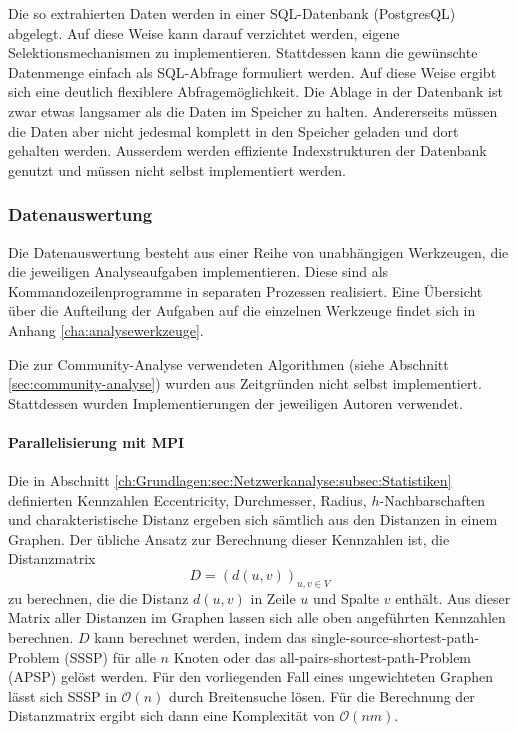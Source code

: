 Die so extrahierten Daten werden in einer SQL-Datenbank (PostgresQL)
abgelegt. Auf diese Weise kann darauf verzichtet werden, eigene
Selektionsmechanismen zu implementieren. Stattdessen kann die
gewünschte Datenmenge einfach als SQL-Abfrage formuliert werden. Auf
diese Weise ergibt sich eine deutlich flexiblere
Abfragemöglichkeit. Die Ablage in der Datenbank ist zwar etwas
langsamer als die Daten im Speicher zu halten. Andererseits müssen die
Daten aber nicht jedesmal komplett in den Speicher geladen und dort
gehalten werden. Ausserdem werden effiziente Indexstrukturen der
Datenbank genutzt und müssen nicht selbst implementiert werden.

\subsubsection{Datenauswertung}
\label{sec:datenauswertung}

Die Datenauswertung besteht aus einer Reihe von unabhängigen
Werkzeugen, die die jeweiligen Analyseaufgaben implementieren. Diese
sind als Kommandozeilenprogramme in separaten Prozessen
realisiert. Eine \"Ubersicht \"uber die Aufteilung der Aufgaben auf
die einzelnen Werkzeuge findet sich in Anhang
\ref{cha:analysewerkzeuge}.

Die zur Community-Analyse verwendeten Algorithmen (siehe Abschnitt
\ref{sec:community-analyse}) wurden aus Zeitgr\"unden nicht selbst
implementiert. Stattdessen wurden Implementierungen der jeweiligen
Autoren verwendet.

\paragraph{Parallelisierung mit MPI}
\label{sec:parall-mitt-mpi}

Die in Abschnitt
\ref{ch:Grundlagen:sec:Netzwerkanalyse:subsec:Statistiken} definierten
Kennzahlen Eccentricity, Durchmesser, Radius, $h$-Nachbarschaften und
charakteristische Distanz ergeben sich s\"amtlich aus den Distanzen in
einem Graphen. Der \"ubliche Ansatz zur Berechnung dieser Kennzahlen
ist, die Distanzmatrix
\begin{equation}
  \label{eq:7}
  D = (d(u, v))_{u, v\in V}
\end{equation}
zu berechnen, die die Distanz $d(u, v)$ in Zeile $u$ und Spalte $v$
enth\"alt\cite{Brinkmeier2004}. Aus dieser Matrix aller Distanzen im
Graphen lassen sich alle oben angef\"uhrten Kennzahlen berechnen. $D$
kann berechnet werden, indem das single-source-shortest-path-Problem
(SSSP) f\"ur alle $n$ Knoten oder das all-pairs-shortest-path-Problem
(APSP) gel\"ost werden. F\"ur den vorliegenden Fall eines
ungewichteten Graphen l\"asst sich SSSP in $\mathcal{O}(n)$ durch
Breitensuche l\"osen. F\"ur die Berechnung der Distanzmatrix ergibt
sich dann eine Komplexit\"at von $\mathcal{O}(nm)$.

